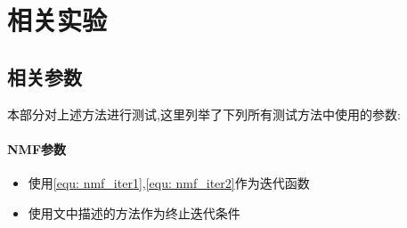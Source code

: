 
\section{相关实验}
\subsection{相关参数}
本部分对上述方法进行测试,这里列举了下列所有测试方法中使用的参数:
	\paragraph{NMF参数}
	\begin{itemize}
		\item 使用\ref{equ: nmf_iter1},\ref{equ: nmf_iter2}作为迭代函数
		\item 使用文中描述的方法作为终止迭代条件
	\end{itemize}
	
